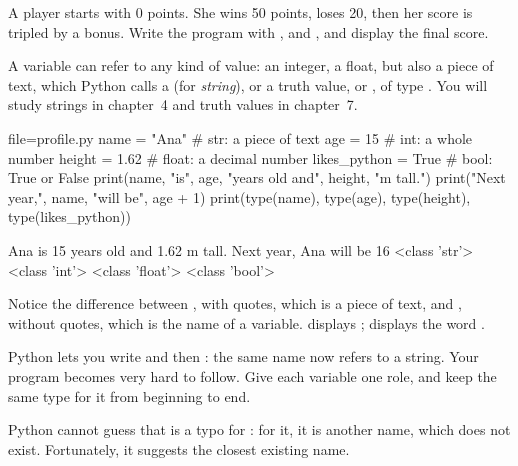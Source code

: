 \begin{atoi}
A player starts with 0 points. She wins 50 points, loses 20, then her score is tripled by a bonus.
Write the program with \py{+=}, \py{-=} and \py{*=}, and display the final score.
\end{atoi}


A variable can refer to any kind of value: an integer, a float, but also a piece of text, which
Python calls a  (for \emph{string}), or a truth value,  or , of type
. You will study strings in chapter~4 and truth values in chapter~7.

\begin{code}{file=profile.py}
name = "Ana"           # str: a piece of text
age = 15               # int: a whole number
height = 1.62          # float: a decimal number
likes_python = True    # bool: True or False
print(name, "is", age, "years old and", height, "m tall.")
print("Next year,", name, "will be", age + 1)
print(type(name), type(age), type(height), type(likes_python))
\end{code}
\begin{sortie}
Ana is 15 years old and 1.62 m tall.
Next year, Ana will be 16
<class 'str'> <class 'int'> <class 'float'> <class 'bool'>
\end{sortie}

Notice the difference between , with quotes, which is a piece of text, and ,
without quotes, which is the name of a variable.  displays ;
 displays the word .

\begin{attention}
Python lets you write  and then : the same name now refers to a string. Your
program becomes very hard to follow. Give each variable one role, and keep the same type for it from
beginning to end.
\end{attention}


Python cannot guess that  is a typo for : for it, it is another name, which does
not exist. Fortunately, it suggests the closest existing name.

